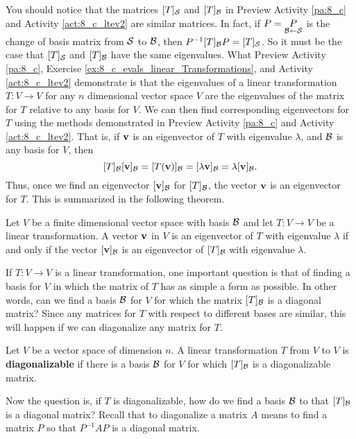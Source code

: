 You should notice that the matrices $[T]_{\mathcal{S}}$ and $[T]_{\mathcal{B}}$ in Preview Activity \ref{pa:8_c} and Activity \ref{act:8_c_ltev2} are similar matrices. In fact, if $P = \underset{\mathcal{B} \leftarrow \mathcal{S}}{P}$ is the change of basis matrix from $\mathcal{S}$ to $\mathcal{B}$, then $P^{-1}[T]_{\mathcal{B}}P = [T]_{\mathcal{S}}$. So it must be the case that $[T]_{\mathcal{S}}$ and $[T]_{\mathcal{B}}$ have the same eigenvalues. What Preview Activity \ref{pa:8_c}, Exercise \ref{ex:8_c_evals_linear_Transformations}, and Activity \ref{act:8_c_ltev2} demonstrate is that the eigenvalues of a linear transformation $T : V \to V$ for any $n$ dimensional vector space $V$ are the eigenvalues of the matrix for $T$ relative to any basis for $V$. We can then find corresponding eigenvectors for $T$ using the methods demonstrated in Preview Activity \ref{pa:8_c} and Activity \ref{act:8_c_ltev2}. That is, if $\mathbf{v}$ is an eigenvector of $T$ with eigenvalue $\lambda$, and $\mathcal{B}$ is any basis for $V$, then 
\[[T]_{\mathcal{B}}[\mathbf{v}]_{\mathcal{B}} = [T(\mathbf{v})]_{\mathcal{B}} = [\lambda \mathbf{v}]_{\mathcal{B}} = \lambda [\mathbf{v}]_{\mathcal{B}}.\]
Thus, once we find an eigenvector $[\mathbf{v}]_{\mathcal{B}}$ for $[T]_{\mathcal{B}}$, the vector $\mathbf{v}$ is an eigenvector for $T$. This is summarized in the following theorem.

\begin{theorem} Let $V$ be a finite dimensional vector space with basis $\mathcal{B}$ and let $T : V \to V$ be a linear transformation. A vector $\mathbf{v}$ in $V$ is an eigenvector of $T$ with eigenvalue $\lambda$ if and only if the vector $[\mathbf{v}]_{\mathcal{B}}$ is an eigenvector of $[T]_{\mathcal{B}}$ with eigenvalue $\lambda$. 
\end{theorem} 



If $T : V \to V$ is a linear transformation, one important question is that of finding a basis for $V$ in which the matrix of $T$ has as simple a form as possible. In other words, can we find a basis $\mathcal{B}$ for $V$ for which the matrix $[T]_{\mathcal{B}}$ is a diagonal matrix? Since any matrices for $T$ with respect to different bases are similar, this will happen if we can diagonalize any matrix for $T$. 

\begin{definition} Let $V$ be a vector space of dimension $n$. A linear transformation $T$ from $V$ to $V$ is \textbf{diagonalizable} if there is a basis $\mathcal{B}$ for $V$ for which $[T]_{\mathcal{B}}$ is a diagonalizable matrix. 
\end{definition}

Now the question is, if $T$ is diagonalizable, how do we find a basis $\mathcal{B}$ to that $[T]_{\mathcal{B}}$ is a diagonal matrix? Recall that to diagonalize a matrix $A$ means to find a matrix $P$ so that $P^{-1}AP$ is a diagonal matrix. 

